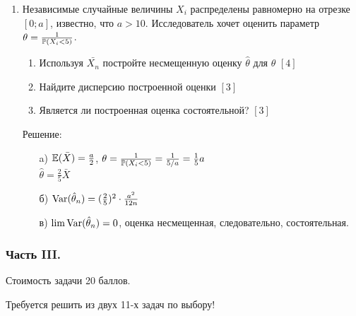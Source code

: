 \documentclass[12pt, a4paper]{article}\usepackage[]{graphicx}\usepackage[]{color}
\begin{document}
\begin{enumerate}
\item Независимые случайные величины $X_{i}$ распределены
равномерно на отрезке $[0;a]$, известно, что $a>10$. Исследователь
хочет оценить
параметр $\theta=\frac{1}{\P(X_{i}<5)}$.
\begin{enumerate}
\item Используя $\bar{X_{n}}$ постройте несмещенную оценку
$\hat{\theta}$ для $\theta$ $[4]$
\item Найдите дисперсию построенной оценки $[3]$
\item Является ли построенная оценка состоятельной? $[3]$
\end{enumerate}
Решение:
\begin{enumerate}
\item[a)] $\E(\bar{X})=\frac{a}{2}$,
$\theta=\frac{1}{\P(X_{i}<5)}=\frac{1}{5/a}=\frac{1}{5}a$ \\
$\hat{\theta}=\frac{2}{5}\bar{X}$
\item[б)] $\Var(\hat{\theta}_{n})=(\frac{2}{5})^{2}\cdot\frac{a^{2}}{12n}$
\item[в)] $\lim \Var(\hat{\theta}_{n})=0$, оценка несмещенная,
следовательно, состоятельная.
\end{enumerate}
\end{enumerate}

\subsubsection*{Часть III.}

Стоимость задачи 20 баллов.

Требуется решить \textbf{} из двух 11-х задач по
выбору!
\end{document}
